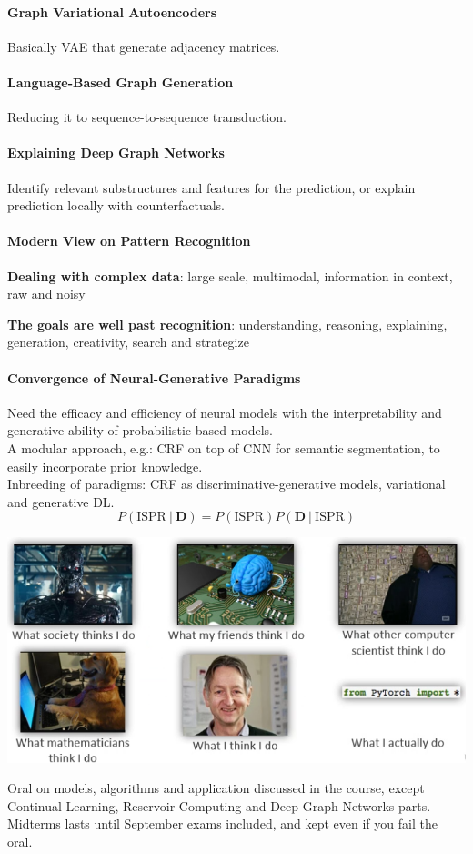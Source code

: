 \documentclass[10pt]{report}
\begin{document}
\paragraph{Graph Variational Autoencoders} Basically VAE that generate adjacency matrices. %
\paragraph{Language-Based Graph Generation} Reducing it to sequence-to-sequence transduction.
\paragraph{Explaining Deep Graph Networks} Identify relevant substructures and features for the prediction, or explain prediction locally with counterfactuals.
\paragraph{Modern View on Pattern Recognition}
\begin{list}{}{}
	\item \textbf{Dealing with complex data}: large scale, multimodal, information in context, raw and noisy
	\item \textbf{The goals are well past recognition}: understanding, reasoning, explaining, generation, creativity, search and strategize
\end{list}
\paragraph{Convergence of Neural-Generative Paradigms} Need the efficacy and efficiency of neural models with the interpretability and generative ability of probabilistic-based models.\\
A modular approach, e.g.: CRF on top of CNN for semantic segmentation, to easily incorporate prior knowledge.\\
Inbreeding of paradigms: CRF as discriminative-generative models, variational and generative DL.
$$P(\text{ISPR}\:|\:\mathbf{D}) = P(\text{ISPR})P(\mathbf{D}\:|\:\text{ISPR})$$
\begin{center}
	\includegraphics[scale=0.75]{206.png}
\end{center}
Oral on models, algorithms and application discussed in the course, except Continual Learning, Reservoir Computing and Deep Graph Networks parts.\\
Midterms lasts until September exams included, and kept even if you fail the oral.
\end{document}
